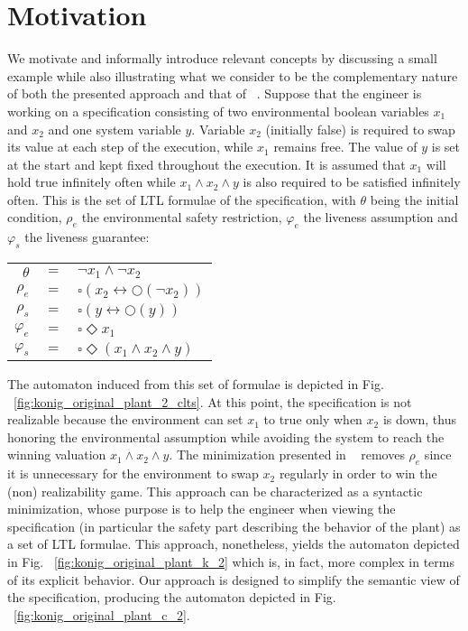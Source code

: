 \section{Motivation}\label{sec:motivation}
We motivate and informally introduce relevant concepts by discussing a small example while also illustrating what we consider to be the complementary nature 
of both the presented approach and that of ~\cite{DBLP:conf/hvc/KonighoferHB10}. Suppose that the engineer is working on a specification consisting of two environmental boolean variables $x_1$ and $x_2$ and one system variable $y$. Variable $x_2$ (initially false) is required to swap its value at each step of the execution, while $x_1$ remains free. The value of $y$ is set at the start and kept fixed throughout the execution.
It is assumed that $x_1$ will hold true infinitely often while $x_1 \wedge x_2 \wedge y$ is also required to be satisfied infinitely often. This is the set of LTL formulae of the specification, with $\theta$ being the initial condition, $\rho_e$ the environmental safety restriction, $\varphi_e$ the liveness assumption and $\varphi_s$ the liveness guarantee:
\begin{center}
	\begin{tabular}{ r c l }
		$\theta$& $=$ &$\neg x_1 \wedge \neg x_2$\\
		$\rho_e$& $=$ &$\square(x_2 \leftrightarrow \bigcirc(\neg x_2))$\\
		$\rho_s$& $=$ &$\square(y \leftrightarrow \bigcirc(y))$\\		
		$\varphi_e$& $=$ &$\square \Diamond x_1$\\
		$\varphi_s$& $=$ &$\square \Diamond (x_1 \wedge x_2 \wedge y)$\\
	\end{tabular}
\end{center}

The automaton induced from this set of formulae is depicted in Fig. ~\ref{fig:konig_original_plant_2_clts}. At this point, the specification is not realizable because the environment can set $x_1$ to true only when $x_2$ is down, thus honoring the environmental assumption while avoiding the system to reach the winning valuation $x_1 \wedge x_2 \wedge y$. The minimization presented in ~\cite{DBLP:conf/hvc/KonighoferHB10} removes $\rho_e$ since it is unnecessary for the environment to swap $x_2$ regularly in order to win the (non) realizability game. This approach can be characterized as a syntactic minimization, whose purpose is to help the engineer when viewing the specification (in particular the safety part describing the behavior of the plant) as a set of LTL formulae. This approach, nonetheless, yields the automaton depicted in Fig. ~\ref{fig:konig_original_plant_k_2} which is, in fact, more complex in terms of its explicit behavior. Our approach is designed to simplify the semantic view of the specification, producing the automaton depicted in Fig. ~\ref{fig:konig_original_plant_c_2}. 


